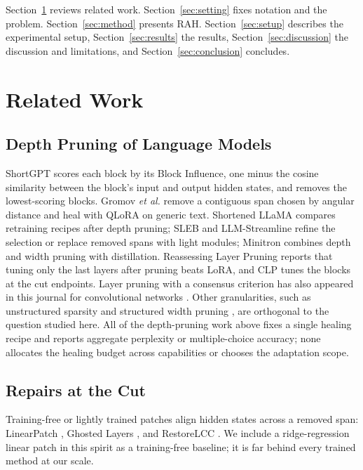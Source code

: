 \documentclass{ieeeaccess}
\newcommand{\RAH}{RAH}
\begin{document}
Section~\ref{sec:related} reviews related work. Section~\ref{sec:setting} fixes notation and the problem. Section~\ref{sec:method} presents \RAH. Section~\ref{sec:setup} describes the experimental setup, Section~\ref{sec:results} the results, Section~\ref{sec:discussion} the discussion and limitations, and Section~\ref{sec:conclusion} concludes.

\section{Related Work}
\label{sec:related}

\subsection{Depth Pruning of Language Models}
ShortGPT \cite{men2024shortgpt} scores each block by its Block Influence, one minus the cosine similarity between the block's input and output hidden states, and removes the lowest-scoring blocks. Gromov \emph{et al.} \cite{gromov2024unreasonable} remove a contiguous span chosen by angular distance and heal with QLoRA \cite{dettmers2023qlora} on generic text. Shortened LLaMA \cite{kim2024shortened} compares retraining recipes after depth pruning; SLEB \cite{song2024sleb} and LLM-Streamline \cite{chen2024streamline} refine the selection or replace removed spans with light modules; Minitron \cite{muralidharan2024minitron,sreenivas2024minitronpractice} combines depth and width pruning with distillation. Reassessing Layer Pruning \cite{lu2024reassessing} reports that tuning only the last layers after pruning beats LoRA, and CLP \cite{clp2025} tunes the blocks at the cut endpoints. Layer pruning with a consensus criterion has also appeared in this journal for convolutional networks \cite{mugnaini2025consensus}. Other granularities, such as unstructured sparsity \cite{frantar2023sparsegpt,sun2024wanda} and structured width pruning \cite{ma2023llmpruner,xia2024sheared}, are orthogonal to the question studied here. All of the depth-pruning work above fixes a single healing recipe and reports aggregate perplexity or multiple-choice accuracy; none allocates the healing budget across capabilities or chooses the adaptation scope.

\subsection{Repairs at the Cut}
Training-free or lightly trained patches align hidden states across a removed span: LinearPatch \cite{linearpatch2025}, Ghosted Layers \cite{ghosted2026}, and RestoreLCC \cite{restorelcc2025}. We include a ridge-regression linear patch in this spirit as a training-free baseline; it is far behind every trained method at our scale.
\end{document}
